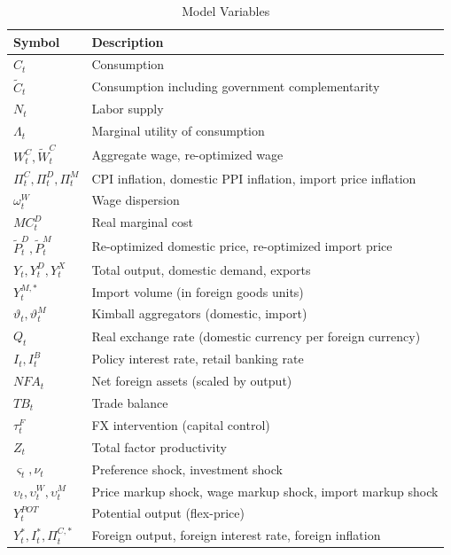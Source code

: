 \documentclass[12pt]{article}
\begin{document}
\begin{table}[H]
\centering
\caption{Model Variables}
\small
\begin{tabular}{lp{10cm}}
\toprule
\textbf{Symbol} & \textbf{Description} \\
\midrule
$C_t$ & Consumption \\
$\tilde{C}_t$ & Consumption including government complementarity \\
$N_t$ & Labor supply \\
$\Lambda_t$ & Marginal utility of consumption \\
$W_t^C, \tilde{W}_t^C$ & Aggregate wage, re-optimized wage \\
$\Pi_t^C, \Pi_t^D, \Pi_t^M$ & CPI inflation, domestic PPI inflation, import price inflation \\
$\omega_t^W$ & Wage dispersion \\
$MC_t^D$ & Real marginal cost \\
$\tilde{P}_t^D, \tilde{P}_t^M$ & Re-optimized domestic price, re-optimized import price \\
$Y_t, Y_t^D, Y_t^X$ & Total output, domestic demand, exports \\
$Y_t^{M,*}$ & Import volume (in foreign goods units) \\
$\vartheta_t, \vartheta_t^M$ & Kimball aggregators (domestic, import) \\
$Q_t$ & Real exchange rate (domestic currency per foreign currency) \\
$I_t, I_t^B$ & Policy interest rate, retail banking rate \\
$NFA_t$ & Net foreign assets (scaled by output) \\
$TB_t$ & Trade balance \\
$\tau_t^F$ & FX intervention (capital control) \\
$Z_t$ & Total factor productivity \\
$\varsigma_t, \nu_t$ & Preference shock, investment shock \\
$\upsilon_t, \upsilon_t^W, \upsilon_t^M$ & Price markup shock, wage markup shock, import markup shock \\
$Y_t^{POT}$ & Potential output (flex-price) \\
$Y_t^*, I_t^*, \Pi_t^{C,*}$ & Foreign output, foreign interest rate, foreign inflation \\
\bottomrule
\end{tabular}
\end{table}
\end{document}
